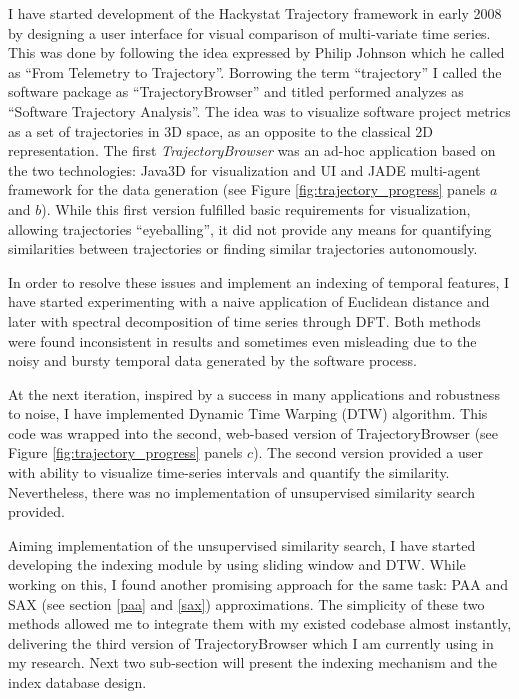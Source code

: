 I have started development of the Hackystat Trajectory framework in early 2008 by designing a user interface for visual comparison of multi-variate time series. This was done by following the idea expressed by Philip Johnson which he called as ``From Telemetry to Trajectory''. Borrowing the term ``trajectory'' I called the software package as ``TrajectoryBrowser'' and titled performed analyzes as ``Software Trajectory Analysis''. The idea was to visualize software project metrics as a set of trajectories in 3D space, as an opposite to the classical 2D representation. The first \textit{TrajectoryBrowser} was an ad-hoc application based on the two technologies: Java3D for visualization and UI and JADE multi-agent framework \cite{citeulike:1230319} for the data generation (see Figure \ref{fig:trajectory_progress} panels $a$ and $b$). While this first version fulfilled basic requirements for visualization, allowing trajectories ``eyeballing'', it did not provide any means for quantifying similarities between trajectories or finding similar trajectories autonomously.

In order to resolve these issues and implement an indexing of temporal features, I have started experimenting with a naive application of Euclidean distance and later with spectral decomposition of time series through DFT. Both methods were found inconsistent in results and sometimes even misleading due to the noisy and bursty temporal data generated by the software process. 

At the next iteration, inspired by a success in many applications and robustness to noise, I have implemented Dynamic Time Warping (DTW) algorithm. This code was wrapped into the second, web-based version of TrajectoryBrowser (see Figure \ref{fig:trajectory_progress} panels $c$). The second version provided a user with ability to visualize time-series intervals and quantify the similarity. Nevertheless, there was no implementation of unsupervised similarity search provided.

Aiming implementation of the unsupervised similarity search, I have started developing the indexing module by using sliding window and DTW. While working on this, I found another promising approach for the same task: PAA and SAX (see section \ref{paa} and \ref{sax}) approximations. The simplicity of these two methods allowed me to integrate them with my existed codebase almost instantly, delivering the third version of TrajectoryBrowser which I am currently using in my research. Next two sub-section will present the indexing mechanism and the index database design. 

